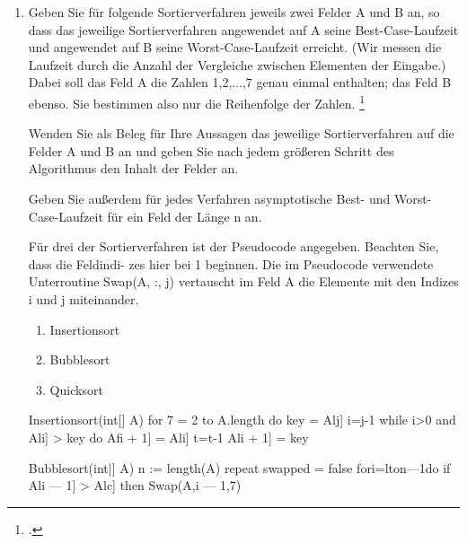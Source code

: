 \documentclass{lehramt-informatik-aufgabe}
\begin{document}

\begin{enumerate}


\item Geben Sie für folgende Sortierverfahren jeweils zwei Felder A und B
an, so dass das jeweilige Sortierverfahren angewendet auf A seine
Best-Case-Laufzeit und angewendet auf B seine Worst-Case-Laufzeit
erreicht. (Wir messen die Laufzeit durch die Anzahl der Vergleiche
zwischen Elementen der Eingabe.) Dabei soll das Feld A die Zahlen
1,2,...,7 genau einmal enthalten; das Feld B ebenso. Sie bestimmen also
nur die Reihenfolge der Zahlen.
\footcite{examen:46115:2021:03}

Wenden Sie als Beleg für Ihre Aussagen das jeweilige Sortierverfahren
auf die Felder A und B an und geben Sie nach jedem größeren Schritt des
Algorithmus den Inhalt der Felder an.

Geben Sie außerdem für jedes Verfahren asymptotische Best- und
Worst-Case-Laufzeit für ein Feld der Länge n an.

Für drei der Sortierverfahren ist der Pseudocode angegeben. Beachten
Sie, dass die Feldindi- zes hier bei 1 beginnen. Die im Pseudocode
verwendete Unterroutine Swap(A, :, j) vertauscht im Feld A die Elemente
mit den Indizes i und j miteinander.

\begin{enumerate}

\item Insertionsort

\item Bubblesort

\item Quicksort

\end{enumerate}
Insertionsort(int[] A)
for 7 = 2 to A.length do
key = Alj]
i=j-1
while i>0 and Ali] > key do
Afi + 1] = Ali]
t=t-1
Ali + 1] = key

Bubblesort(int|] A)
n := length(A)
repeat
swapped = false
fori=lton—1do
if Ali — 1] > Alc] then
Swap(A,i — 1,7)


\end{enumerate}
\end{document}
